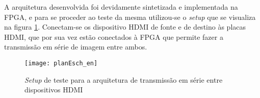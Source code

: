 %
%

	


A arquitetura desenvolvida foi devidamente sintetizada e implementada na FPGA, e para se proceder ao teste da mesma utilizou-se o \textit{setup} que se visualiza na figura \ref{fig:planoE_setup}. Conectam-se os dispositivo HDMI de fonte e de destino às placas HDMI, que por sua vez estão conectados à FPGA que permite fazer a transmissão em série de imagem entre ambos.

\begin{figure}[h!]
	\begin{center}
		\leavevmode
		\texttt{[image: planEsch\_en]}
		\captionsetup{width=1.0\linewidth}
		\caption[\textit{Setup} de teste para a arquitetura de transmissão em série entre dispositivos HDMI]{\textit{Setup} de teste para a arquitetura de transmissão em série entre dispositivos HDMI}
		\label{fig:planoE_setup}
	\end{center}
\end{figure}

